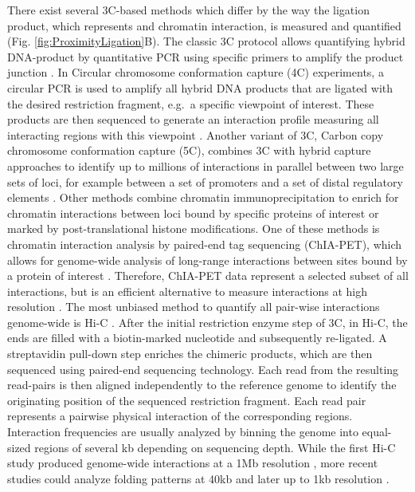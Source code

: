 \documentclass[a4paper,twoside=true,openright,parskip=full,chapterprefix=true,11pt,headings=normal,bibliography=totoc,listof=totoc,titlepage=on,captions=tableabove,draft=false]{scrreprt}
\theoremstyle{definition}
\theoremstyle{definition}
\theoremstyle{definition}
\theoremstyle{remark}
\begin{document}
There exist several 3C-based methods which differ by the way the
ligation product, which represents and chromatin interaction, is
measured and quantified (Fig. \ref{fig:ProximityLigation}B). The classic
3C protocol allows quantifying hybrid DNA-product by quantitative PCR
using specific primers to amplify the product junction
\citep{Dekker2002}. In Circular chromosome conformation capture (4C)
experiments, a circular PCR is used to amplify all hybrid DNA products
that are ligated with the desired restriction fragment, e.g.~a specific
viewpoint of interest. These products are then sequenced to generate an
interaction profile measuring all interacting regions with this
viewpoint \citep{Simonis2006, Noordermeer2011}. Another variant of 3C,
Carbon copy chromosome conformation capture (5C), combines 3C with
hybrid capture approaches to identify up to millions of interactions in
parallel between two large sets of loci, for example between a set of
promoters and a set of distal regulatory elements
\citep{Dostie2006, Sanyal2012}. Other methods combine chromatin
immunoprecipitation to enrich for chromatin interactions between loci
bound by specific proteins of interest or marked by post-translational
histone modifications. One of these methods is chromatin interaction
analysis by paired-end tag sequencing (ChIA-PET), which allows for
genome-wide analysis of long-range interactions between sites bound by a
protein of interest \citep{Fullwood2009}. Therefore, ChIA-PET data
represent a selected subset of all interactions, but is an efficient
alternative to measure interactions at high resolution \citep{Tang2015}.
The most unbiased method to quantify all pair-wise interactions
genome-wide is Hi-C \citep{Lieberman-Aiden2009}. After the initial
restriction enzyme step of 3C, in Hi-C, the ends are filled with a
biotin-marked nucleotide and subsequently re-ligated. A streptavidin
pull-down step enriches the chimeric products, which are then sequenced
using paired-end sequencing technology. Each read from the resulting
read-pairs is then aligned independently to the reference genome to
identify the originating position of the sequenced restriction fragment.
Each read pair represents a pairwise physical interaction of the
corresponding regions. Interaction frequencies are usually analyzed by
binning the genome into equal-sized regions of several kb depending on
sequencing depth. While the first Hi-C study produced genome-wide
interactions at a 1Mb resolution \citep{Lieberman-Aiden2009}, more
recent studies could analyze folding patterns at 40kb \citep{Dixon2012}
and later up to 1kb resolution \citep{Rao2014}.
\end{document}

